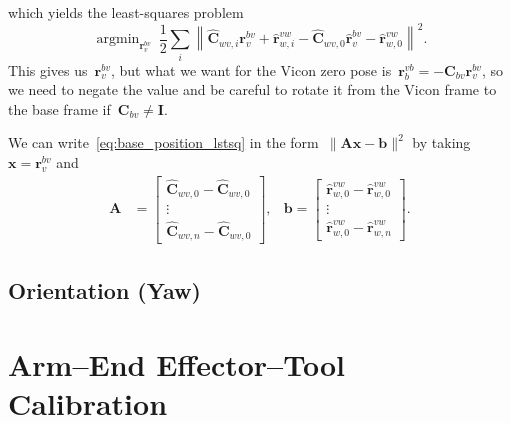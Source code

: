 \documentclass{article}
\DeclareMathOperator*{\argmin}{argmin}
\begin{document}
which yields the least-squares problem
\begin{equation}\label{eq:base_position_lstsq}
  \argmin_{\bm{r}^{bv}_v}\ \frac{1}{2}\sum_i\left\|\hat{\bm{C}}_{wv,i}\bm{r}^{bv}_v + \hat{\bm{r}}^{vw}_{w,i} - \hat{\bm{C}}_{wv,0}\hat{\bm{r}}^{bv}_{v} - \hat{\bm{r}}^{vw}_{w,0}\right\|^2.
\end{equation}
This gives us~$\bm{r}^{bv}_v$, but what we want for the Vicon zero pose is~$\bm{r}^{vb}_b=-\bm{C}_{bv}\bm{r}^{bv}_v$, so we need to negate the value and be careful to rotate it from the Vicon frame to the base frame if~$\bm{C}_{bv}\neq\bm{I}$.

We can write~\eqref{eq:base_position_lstsq} in the form~$\|\bm{A}\bm{x}-\bm{b}\|^2$ by taking~$\bm{x}=\bm{r}^{bv}_v$ and
\begin{align*}
  \bm{A} &= \begin{bmatrix}
    \hat{\bm{C}}_{wv,0} - \hat{\bm{C}}_{wv,0} \\ \vdots \\ \hat{\bm{C}}_{wv,n} - \hat{\bm{C}}_{wv,0}
  \end{bmatrix}, & \bm{b} = \begin{bmatrix}
  \hat{\bm{r}}^{vw}_{w,0} - \hat{\bm{r}}^{vw}_{w,0} \\ \vdots \\ \hat{\bm{r}}^{vw}_{w,0} - \hat{\bm{r}}^{vw}_{w,n}
  \end{bmatrix}.
\end{align*}

\subsection{Orientation (Yaw)}

\section{Arm--End Effector--Tool Calibration}
\end{document}
